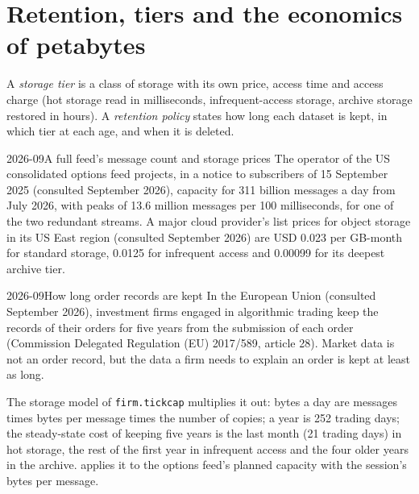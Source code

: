 \section{Retention, tiers and the economics of petabytes}\label{sec:pl:capturing-and-storing-tick-data:economics}

\begin{definition}\label{def:pl:capturing-and-storing-tick-data:tier}
A \emph{storage tier} is a class of storage with its own price, access time and access charge (hot storage
read in milliseconds, infrequent-access storage, archive storage restored in hours). A \emph{retention policy}
states how long each dataset is kept, in which tier at each age, and when it is deleted.
\end{definition}

\begin{dated}{2026-09}{A full feed's message count and storage prices}\label{dat:pl:capturing-and-storing-tick-data:numbers}
The operator of the US consolidated options feed projects, in a notice to subscribers of 15 September 2025 (consulted September
2026), capacity for 311 billion messages a day from July 2026, with peaks of 13.6 million messages per 100 milliseconds, for one
of the two redundant streams. A major cloud provider's list prices for object storage in its US East region (consulted September
2026) are USD 0.023 per GB-month for standard storage, 0.0125 for infrequent access and 0.00099 for its deepest archive tier.
\end{dated}

\begin{dated}{2026-09}{How long order records are kept}\label{dat:pl:capturing-and-storing-tick-data:retention}
In the European Union (consulted September 2026), investment firms engaged in algorithmic trading keep the records of their
orders for five years from the submission of each order (Commission Delegated Regulation (EU) 2017/589, article 28). Market data
is not an order record, but the data a firm needs to explain an order is kept at least as long.
\end{dated}

The storage model of \texttt{firm.tickcap} multiplies it out: bytes a day are messages times bytes per message times the number
of copies; a year is 252 trading days; the steady-state cost of keeping five years is the last month (21 trading days) in hot
storage, the rest of the first year in infrequent access and the four older years in the archive.
 applies it to the options feed's planned capacity with the session's
bytes per message.

